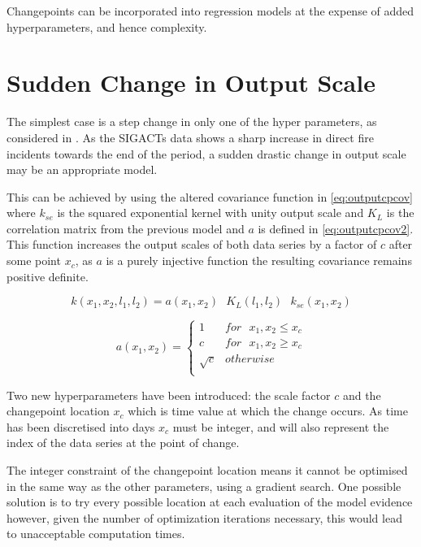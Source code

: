 \documentclass[a4paper,11pt]{report}
\begin{document}
Changepoints can be incorporated into regression models at the expense of added hyperparameters, and hence complexity.

\section{Sudden Change in Output Scale}

The simplest case is a step change in only one of the hyper parameters, as considered in \cite{changepoint-prediction}. As the SIGACTs data shows a sharp increase in direct fire incidents towards the end of the period, a sudden drastic change in output scale may be an appropriate model.

This can be achieved by using the altered covariance function in \ref{eq:outputcpcov} where \(k_{se}\) is the squared exponential kernel with unity output scale and \(K_L\) is the correlation matrix from the previous model and \(a\) is defined in \ref{eq:outputcpcov2}. This function increases the output scales of both data series by a factor of \(c\) after some point \(x_c\), as \(a\) is a purely injective function the resulting covariance remains positive definite. 

\singlespacing
\begin{equation} \label{eq:outputcpcov}
k(x_1,x_2,l_1,l_2) = a(x_1,x_2)\text{ } K_L(l_1,l_2) \text{ }k_{se}(x_1,x_2)
\end{equation}

\begin{equation} \label{eq:outputcpcov2}
a(x_1,x_2) = \begin{cases}
1 & for \text{ } x_1, x_2 \leq x_c \\
c & for \text{ } x_1, x_2 \geq x_c \\ 
\sqrt{c} & otherwise \\ 
\end{cases}
\end{equation}
\doublespacing

Two new hyperparameters have been introduced: the scale factor \(c\) and the changepoint location \(x_c\) which is time value at which the change occurs. As time has been discretised into days \(x_c\) must be integer, and will also represent the index of the data series at the point of change. \par
The integer constraint of the changepoint location means it cannot be optimised in the same way as the other parameters, using a gradient search. One possible solution is to try every possible location at each evaluation of the model evidence however, given the number of optimization iterations necessary, this would lead to unacceptable computation times.
\end{document}

